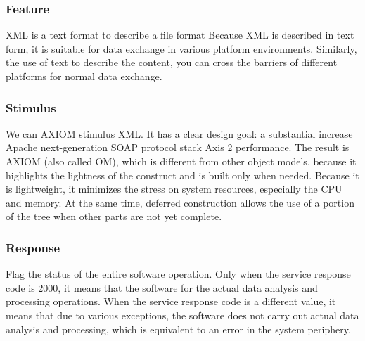 \subsubsection{Feature}
XML is a text format to describe a file format
Because XML is described in text form, it is suitable for data exchange in various platform environments. Similarly, the use of text to describe the content, you can cross the barriers of different platforms for normal data exchange.



\subsubsection{Stimulus}
We can AXIOM stimulus XML. It has a clear design goal: a substantial increase Apache next-generation SOAP protocol stack Axis 2 performance. The result is AXIOM (also called OM), which is different from other object models, because it highlights the lightness of the construct and is built only when needed. Because it is lightweight, it minimizes the stress on system resources, especially the CPU and memory. At the same time, deferred construction allows the use of a portion of the tree when other parts are not yet complete.



\subsubsection{Response}
Flag the status of the entire software operation. Only when the service response code is 2000, it means that the software for the actual data analysis and processing operations. When the service response code is a different value, it means that due to various exceptions, the software does not carry out actual data analysis and processing, which is equivalent to an error in the system periphery.

